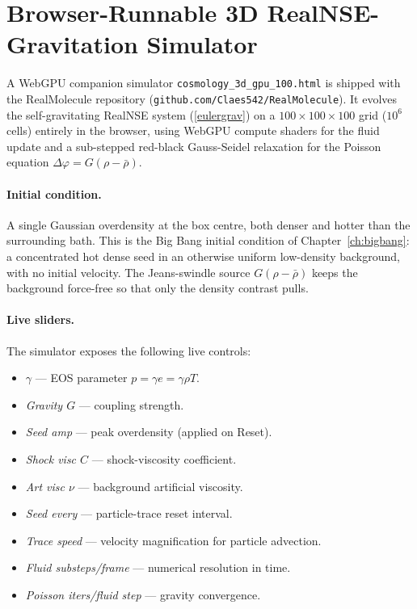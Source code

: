 \section{Browser-Runnable 3D RealNSE-Gravitation Simulator}\label{sec:cosmology_3d_gpu}

A WebGPU companion simulator
\texttt{cosmology\_3d\_gpu\_100.html} is shipped with the
RealMolecule repository
(\texttt{github.com/Claes542/RealMolecule}). It evolves the
self-gravitating RealNSE system (\ref{eulergrav}) on a $100\times100\times
100$ grid ($10^{6}$ cells) entirely in the browser, using WebGPU
compute shaders for the fluid update and a sub-stepped red-black
Gauss-Seidel relaxation for the Poisson equation $\Delta\varphi = G(\rho - \bar\rho)$.

\paragraph{Initial condition.}
A single Gaussian overdensity at the box centre, both denser and
hotter than the surrounding bath. This is the Big Bang initial
condition of Chapter~\ref{ch:bigbang}: a concentrated hot dense seed
in an otherwise uniform low-density background, with no initial
velocity. The Jeans-swindle source $G(\rho - \bar\rho)$ keeps the
background force-free so that only the density contrast pulls.

\paragraph{Live sliders.}
The simulator exposes the following live controls:
\begin{itemize}
\item \emph{$\gamma$} --- EOS parameter $p = \gamma e = \gamma\rho T$.
\item \emph{Gravity $G$} --- coupling strength.
\item \emph{Seed amp} --- peak overdensity (applied on Reset).
\item \emph{Shock visc $C$} --- shock-viscosity coefficient.
\item \emph{Art visc $\nu$} --- background artificial viscosity.
\item \emph{Seed every} --- particle-trace reset interval.
\item \emph{Trace speed} --- velocity magnification for particle advection.
\item \emph{Fluid substeps/frame} --- numerical resolution in time.
\item \emph{Poisson iters/fluid step} --- gravity convergence.
\end{itemize}

